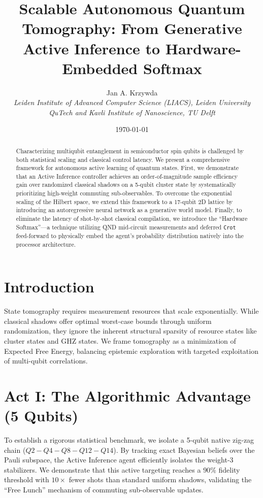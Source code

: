 \documentclass[twocolumn, 10pt, letterpaper]{article}
\title{\textbf{Scalable Autonomous Quantum Tomography: From Generative Active Inference to Hardware-Embedded Softmax}}
\author{Jan A. Krzywda \\ \textit{Leiden Institute of Advanced Computer Science (LIACS), Leiden University} \\ \textit{QuTech and Kavli Institute of Nanoscience, TU Delft}}
\date{\today}
\begin{document}
\maketitle

\begin{abstract}
Characterizing multiqubit entanglement in semiconductor spin qubits is challenged by both statistical scaling and classical control latency. We present a comprehensive framework for autonomous active learning of quantum states. First, we demonstrate that an Active Inference controller achieves an order-of-magnitude sample efficiency gain over randomized classical shadows on a 5-qubit cluster state by systematically prioritizing high-weight commuting sub-observables. To overcome the exponential scaling of the Hilbert space, we extend this framework to a 17-qubit 2D lattice by introducing an autoregressive neural network as a generative world model. Finally, to eliminate the latency of shot-by-shot classical compilation, we introduce the ``Hardware Softmax''---a technique utilizing QND mid-circuit measurements and deferred \texttt{Crot} feed-forward to physically embed the agent's probability distribution natively into the processor architecture. 
\end{abstract}

\section{Introduction}
State tomography requires measurement resources that scale exponentially. While classical shadows offer optimal worst-case bounds through uniform randomization, they ignore the inherent structural sparsity of resource states like cluster states and GHZ states. We frame tomography as a minimization of Expected Free Energy, balancing epistemic exploration with targeted exploitation of multi-qubit correlations.

\section{Act I: The Algorithmic Advantage (5 Qubits)}
To establish a rigorous statistical benchmark, we isolate a 5-qubit native zig-zag chain ($Q2-Q4-Q8-Q12-Q14$). By tracking exact Bayesian beliefs over the Pauli subspace, the Active Inference agent efficiently isolates the weight-3 stabilizers. We demonstrate that this active targeting reaches a $90\%$ fidelity threshold with $10\times$ fewer shots than standard uniform shadows, validating the ``Free Lunch'' mechanism of commuting sub-observable updates.
\end{document}
